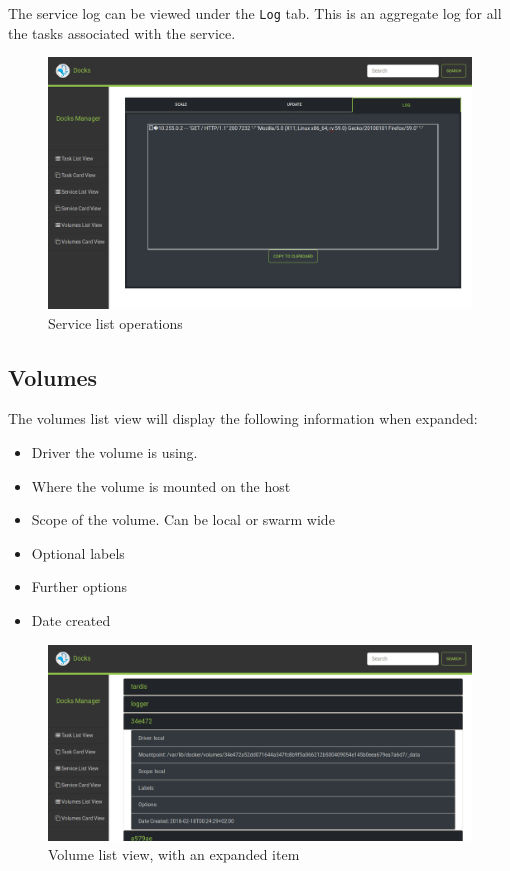 \documentclass[]{article}
\providecommand{\tightlist}{%
	\setlength{\itemsep}{0pt}\setlength{\parskip}{0pt}}
\let\oldtexttt\texttt
\renewcommand{\texttt}[1]{
	\colorbox{Light}{\oldtexttt{#1}}
}
\begin{document}
The service log can be viewed under the \texttt{Log} tab. This is an aggregate log for all the tasks
associated with the service.
\begin{figure}[H]
	\centering
	\includegraphics[scale=0.4]{service_list_log.png}
	\caption{Service list operations}
\end{figure}

\subsection{Volumes}

The volumes list view will display the following information when expanded:
\begin{itemize}
	\tightlist
	\item Driver the volume is using.
	\item Where the volume is mounted on the host
	\item Scope of the volume. Can be local or swarm wide
	\item Optional labels
	\item Further options
	\item Date created
\end{itemize}

\begin{figure}[H]
	\centering
	\includegraphics[scale=0.4]{volume_list.png}
	\caption{Volume list view, with an expanded item}
\end{figure}
\end{document}
